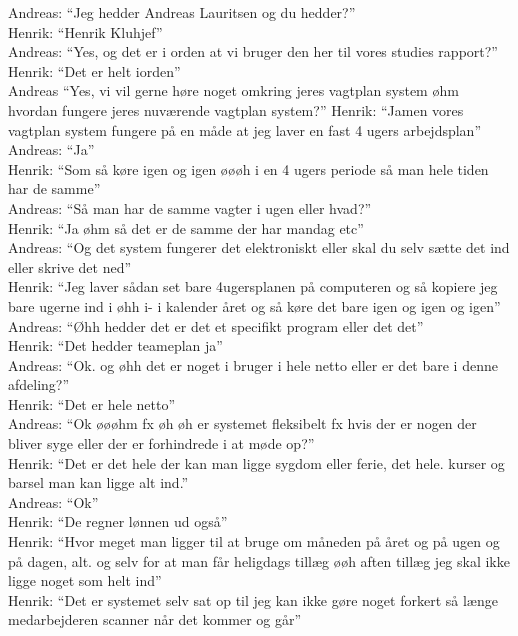 Andreas: “Jeg hedder Andreas Lauritsen og du hedder?”\\
Henrik: “Henrik Kluhjef”\\
Andreas: “Yes, og det er i orden at vi bruger den her til vores studies rapport?”\\
Henrik: “Det er helt iorden”\\
Andreas “Yes, vi vil gerne høre noget omkring jeres vagtplan system øhm hvordan fungere jeres nuværende vagtplan system?”
Henrik: “Jamen vores vagtplan system fungere på en måde at jeg laver en fast 4 ugers arbejdsplan”\\
Andreas: “Ja”\\
Henrik: “Som så køre igen og igen øøøh i en 4 ugers periode så man hele tiden har de samme”\\
Andreas: “Så man har de samme vagter i ugen eller hvad?”\\
Henrik: “Ja øhm så det er de samme der har mandag etc”\\
Andreas: “Og det system fungerer det elektroniskt eller skal du selv sætte det ind eller skrive det ned”\\
Henrik: “Jeg laver sådan set bare 4ugersplanen på computeren og så kopiere jeg bare ugerne ind i øhh i- i kalender året og så køre det bare igen og igen og igen”\\
Andreas: “Øhh hedder det er det et specifikt program eller det det”\\
Henrik: “Det hedder teameplan ja”\\
Andreas: “Ok. og øhh det er noget i bruger i hele netto eller er det bare i denne afdeling?”\\
Henrik: “Det er hele netto”\\
Andreas: “Ok øøøhm fx øh øh er systemet fleksibelt fx hvis der er nogen der bliver syge eller der er forhindrede i at møde op?”\\
Henrik: “Det er det hele der kan man ligge sygdom eller ferie, det hele. kurser og barsel man kan ligge alt ind.”\\
Andreas: “Ok”\\
Henrik: “De regner lønnen ud også”\\
Henrik: “Hvor meget man ligger til at bruge om måneden på året og på ugen og på dagen, alt. og selv for at man får heligdags tillæg øøh aften tillæg jeg skal ikke ligge noget som helt ind”\\
Henrik: “Det er systemet selv sat op til jeg kan ikke gøre noget forkert så længe medarbejderen scanner når det kommer og går”\\
